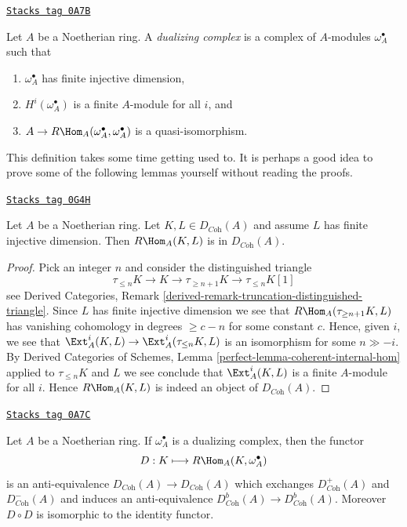 \begin{definition}[Dualizing]
\label{dualizing-definition-dualizing}
\href{https://stacks.math.columbia.edu/tag/0A7B}{\texttt{Stacks tag 0A7B}}

Let $A$ be a Noetherian ring. A {\it dualizing complex} is a
complex of $A$-modules $\omega_A^\bullet$ such that
\begin{enumerate}
\item $\omega_A^\bullet$ has finite injective dimension,
\item $H^i(\omega_A^\bullet)$ is a finite $A$-module for all $i$, and
\item $A \to R\Hom_A(\omega_A^\bullet, \omega_A^\bullet)$
is a quasi-isomorphism.
\end{enumerate}
\end{definition}

This definition takes some time getting used to. It is perhaps a good
idea to prove some of the following lemmas yourself without reading
the proofs.

\begin{lemma}
\label{dualizing-lemma-finite-ext-into-bounded-injective}
\href{https://stacks.math.columbia.edu/tag/0G4H}{\texttt{Stacks tag 0G4H}}

Let $A$ be a Noetherian ring. Let $K, L \in D_{\textit{Coh}}(A)$
and assume $L$ has finite injective dimension. Then
$R\Hom_A(K, L)$ is in $D_{\textit{Coh}}(A)$.
\end{lemma}

\begin{proof}
Pick an integer $n$ and consider the distinguished triangle
$$
\tau_{\leq n}K \to K \to \tau_{\geq n + 1}K \to \tau_{\leq n}K[1]
$$
see Derived Categories, Remark
\ref{derived-remark-truncation-distinguished-triangle}.
Since $L$ has finite injective dimension we see
that $R\Hom_A(\tau_{\geq n + 1}K, L)$ has vanishing
cohomology in degrees $\geq c - n$ for some constant $c$.
Hence, given $i$, we see that
$\Ext^i_A(K, L) \to \Ext^i_A(\tau_{\leq n}K, L)$
is an isomorphism for some $n \gg - i$. By
Derived Categories of Schemes, Lemma \ref{perfect-lemma-coherent-internal-hom}
applied to $\tau_{\leq n}K$ and $L$
we see conclude that $\Ext^i_A(K, L)$ is
a finite $A$-module for all $i$. Hence $R\Hom_A(K, L)$
is indeed an object of $D_{\textit{Coh}}(A)$.
\end{proof}

\begin{lemma}[Dualizing]
\label{dualizing-lemma-dualizing}
\href{https://stacks.math.columbia.edu/tag/0A7C}{\texttt{Stacks tag 0A7C}}

Let $A$ be a Noetherian ring. If $\omega_A^\bullet$ is a dualizing
complex, then the functor
$$
D : K \longmapsto R\Hom_A(K, \omega_A^\bullet)
$$
is an anti-equivalence $D_{\textit{Coh}}(A) \to D_{\textit{Coh}}(A)$
which exchanges $D^+_{\textit{Coh}}(A)$ and $D^-_{\textit{Coh}}(A)$
and induces an anti-equivalence
$D^b_{\textit{Coh}}(A) \to D^b_{\textit{Coh}}(A)$.
Moreover $D \circ D$ is isomorphic to the identity functor.
\end{lemma}

